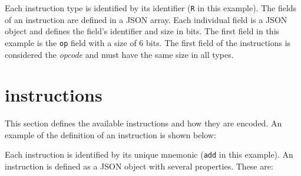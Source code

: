 \documentclass[11pt,a4paper,twoside,titlepage]{report}
\begin{document}


Each instruction type is identified by its identifier (\verb+R+ in this example).
The fields of an instruction are defined in a JSON array. Each individual field is 
a JSON object and defines the field's identifier and size in bits. The first field
in this example is the \verb+op+ field with a size of 6 bits.
The first field of the instructions is considered the \emph{opcode} and must
have the same size in all types.


\section{instructions}

This section defines the available instructions and how they are encoded.
An example of the definition of an instruction is shown below:



Each instruction is identified by its unique mnemonic (\verb+add+ in this example).
An instruction is defined as a JSON object with several properties. These are:
\end{document}
